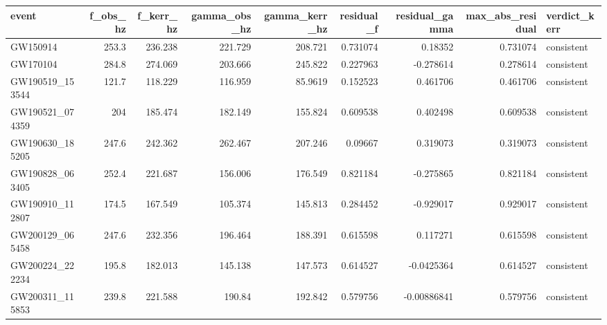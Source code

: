 \begin{tabular}{lrrrrrrrl}
\toprule
event & f\_obs\_hz & f\_kerr\_hz & gamma\_obs\_hz & gamma\_kerr\_hz & residual\_f & residual\_gamma & max\_abs\_residual & verdict\_kerr \\
\midrule
GW150914 & 253.3 & 236.238 & 221.729 & 208.721 & 0.731074 & 0.18352 & 0.731074 & consistent \\
GW170104 & 284.8 & 274.069 & 203.666 & 245.822 & 0.227963 & -0.278614 & 0.278614 & consistent \\
GW190519\_153544 & 121.7 & 118.229 & 116.959 & 85.9619 & 0.152523 & 0.461706 & 0.461706 & consistent \\
GW190521\_074359 & 204 & 185.474 & 182.149 & 155.824 & 0.609538 & 0.402498 & 0.609538 & consistent \\
GW190630\_185205 & 247.6 & 242.362 & 262.467 & 207.246 & 0.09667 & 0.319073 & 0.319073 & consistent \\
GW190828\_063405 & 252.4 & 221.687 & 156.006 & 176.549 & 0.821184 & -0.275865 & 0.821184 & consistent \\
GW190910\_112807 & 174.5 & 167.549 & 105.374 & 145.813 & 0.284452 & -0.929017 & 0.929017 & consistent \\
GW200129\_065458 & 247.6 & 232.356 & 196.464 & 188.391 & 0.615598 & 0.117271 & 0.615598 & consistent \\
GW200224\_222234 & 195.8 & 182.013 & 145.138 & 147.573 & 0.614527 & -0.0425364 & 0.614527 & consistent \\
GW200311\_115853 & 239.8 & 221.588 & 190.84 & 192.842 & 0.579756 & -0.00886841 & 0.579756 & consistent \\
\bottomrule
\end{tabular}
